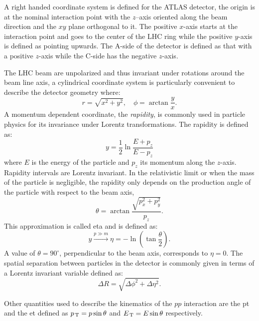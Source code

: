 A right handed coordinate system is defined for the ATLAS detector, the origin
is at the nominal interaction point with the $z$--axis oriented along the beam
direction and the $xy$ plane orthogonal to it. The positive $x$-axis starts at
the interaction point and goes to the center of the LHC ring while the positive
$y$-axis is defined as pointing upwards. The A-side of the detector is defined
as that with a positive $z$-axis while the C-side has the negative $z$-axis.

The LHC beam are unpolarized and thus invariant under rotations around the beam
line axis, a cylindrical coordinate system is particularly convenient to
describe the detector geometry where:
\begin{equation}
  \label{eq:57}
  r = \sqrt{x^2 + y^2}, \quad \phi = \arctan \frac{y}{x}.
\end{equation}
A momentum dependent coordinate, the \emph{rapidity}, is commonly used in
particle physics for its invariance under Lorentz transformations. The rapidity
is defined as:
\begin{equation}
  \label{eq:58}
  y = \frac{1}{2} \ln \frac{E + p_z}{E - p_z}
\end{equation}
where $E$ is the energy of the particle and $p_z$ its momentum along the
$z$-axis. Rapidity intervals are Lorentz invariant. In the relativistic limit or
when the mass of the particle is negligible, the rapidity only depends on the
production angle of the particle with respect to the beam axis,
\begin{equation}
  \label{eq:59}
  \theta = \arctan \frac{\sqrt{p_x^2 + p_y^2}}{p_z}.
\end{equation}
This approximation is called \gls{eta} and is defined as:
\begin{equation}
  \label{eq:60}
  y \xrightarrow{p \gg m} \eta = - \ln \left( \tan \frac{\theta}{2} \right).
\end{equation}
A value of $\theta = 90^{\circ}$, perpendicular to the beam axis, corresponds to
$\eta = 0$. The spatial separation between particles in the detector is commonly
given in terms of a Lorentz invariant variable defined as:
\begin{equation}
  \label{eq:61}
  \Delta R = \sqrt{\Delta \phi^2 + \Delta \eta^2}.
\end{equation}

Other quantities used to describe the kinematics of the $pp$ interaction are the
\gls{pt} and the \gls{et} defined as $p_\mathrm{\, T} = p \sin \theta$ and
$E_\mathrm{\, T} = E \sin \theta$ respectively.
